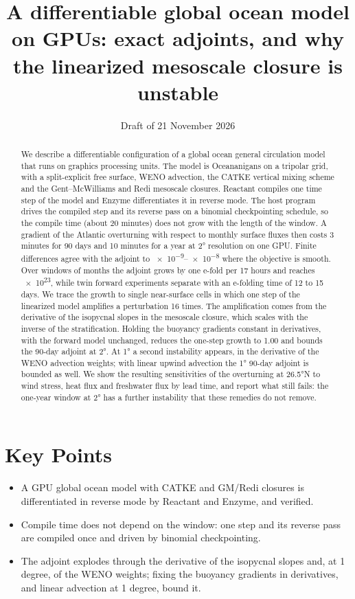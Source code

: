 \documentclass[11pt]{article}
\title{A differentiable global ocean model on GPUs: exact adjoints, and why the linearized mesoscale closure is unstable}
\author{\pending{Authors and affiliations}}
\date{Draft of 21 November 2026}
\begin{document}
\maketitle

\section*{Key Points}
\begin{itemize}
  \item A GPU global ocean model with CATKE and GM/Redi closures is differentiated in reverse mode by Reactant
        and Enzyme, and verified.
  \item Compile time does not depend on the window: one step and its reverse pass are compiled once and driven by
        binomial checkpointing.
  \item The adjoint explodes through the derivative of the isopycnal slopes and, at 1 degree, of the WENO
        weights; fixing the buoyancy gradients in derivatives, and linear advection at 1 degree, bound it.
\end{itemize}

\begin{abstract}
We describe a differentiable configuration of a global ocean general circulation model that runs on graphics
processing units. The model is Oceananigans on a tripolar grid, with a split-explicit free surface, WENO advection,
the CATKE vertical mixing scheme and the Gent--McWilliams and Redi mesoscale closures. Reactant compiles one time
step of the model and Enzyme differentiates it in reverse mode. The host program drives the compiled step and its
reverse pass on a binomial checkpointing schedule, so the compile time (about 20 minutes) does not grow with the
length of the window. A gradient of the Atlantic overturning with respect to monthly surface fluxes then costs
3 minutes for 90 days and 10 minutes for a year at \ang{2} resolution on one GPU. Finite differences agree with the
adjoint to \numrange{e-9}{e-8} where the objective is smooth. Over windows of months the adjoint grows by one
e-fold per 17 hours and reaches \num{e23}, while twin forward experiments separate with an e-folding time of 12 to
15 days. We trace the growth to single near-surface cells in which one step of the linearized model amplifies a
perturbation 16 times. The amplification comes from the derivative of the isopycnal slopes in the mesoscale
closure, which scales with the inverse of the stratification. Holding the buoyancy gradients constant in
derivatives, with the forward model unchanged, reduces the one-step growth to 1.00 and bounds the 90-day adjoint
at \ang{2}. At \ang{1} a second instability appears, in the derivative of the WENO advection weights; with
linear upwind advection the \ang{1} 90-day adjoint is bounded as well. We show the resulting sensitivities of the
overturning at \ang{26.5}N to wind stress, heat flux and freshwater flux by lead time, and report what still
fails: the one-year window at \ang{2} has a further instability that these remedies do not remove.
\end{abstract}
\end{document}
